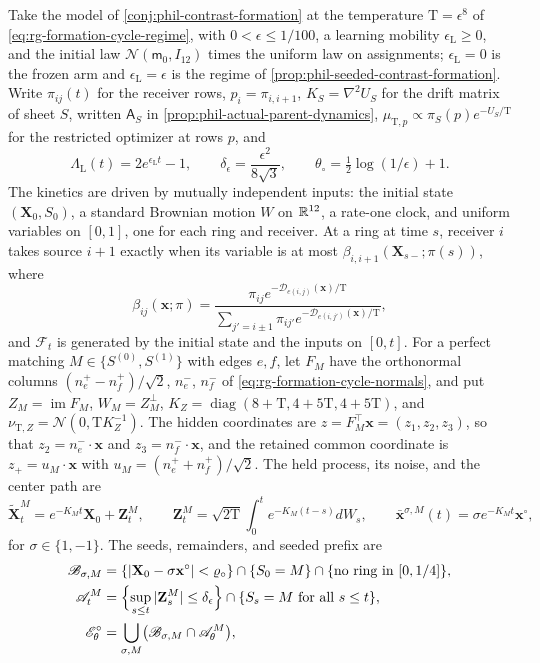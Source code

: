 Take the model of \cref{conj:phil-contrast-formation} at the temperature
\(\mathrm T=\epsilon^8\) of \cref{eq:rg-formation-cycle-regime}, with
\(0<\epsilon\le1/100\), a learning mobility \(\epsilon_{\mathrm L}\ge0\), and
the initial law \(\mathcal N(\mathsf m_0,I_{12})\) times the uniform law on
assignments; \(\epsilon_{\mathrm L}=0\) is the frozen arm and
\(\epsilon_{\mathrm L}=\epsilon\) is the regime of
\cref{prop:phil-seeded-contrast-formation}. Write \(\pi_{ij}(t)\) for the
receiver rows, \(p_i=\pi_{i,i+1}\), \(K_S=\nabla^2U_S\) for the drift matrix
of sheet \(S\), written \(\mathsf A_S\) in
\cref{prop:phil-actual-parent-dynamics},
\(\mu_{\mathrm T,p}\propto\pi_S(p)e^{-U_S/\mathrm T}\) for the
restricted optimizer at rows \(p\), and
\[
 \Lambda_{\mathrm L}(t)=2e^{\epsilon_{\mathrm L}t}-1,\qquad
 \delta_\epsilon=\frac{\epsilon^2}{8\sqrt3},\qquad
 \theta_\circ=\tfrac12\log(1/\epsilon)+1 .
\]
The kinetics are driven by mutually independent inputs: the initial state
\((\mathbf X_0,S_0)\), a standard Brownian motion \(W\) on \(\mathbb R^{12}\), a
rate-one clock, and uniform variables on \([0,1]\), one for each ring and
receiver. At a ring at time \(s\), receiver \(i\) takes source \(i+1\)
exactly when its variable is at most \(\beta_{i,i+1}(\mathbf X_{s-};\pi(s))\),
where
\[
 \beta_{ij}(\mathbf x;\pi)=
 \frac{\pi_{ij}e^{-\mathcal D_{e(i,j)}(\mathbf x)/\mathrm T}}
      {\sum_{j'=i\pm1}\pi_{ij'}e^{-\mathcal D_{e(i,j')}(\mathbf x)/\mathrm T}},
\]
and \(\mathcal F_t\) is generated by the initial state and the inputs on
\([0,t]\). For a perfect matching \(M\in\{S^{(0)},S^{(1)}\}\) with edges
\(e,f\), let \(F_M\) have the orthonormal columns
\((n^+_e-n^+_f)/\sqrt2\), \(n^-_e\), \(n^-_f\) of
\cref{eq:rg-formation-cycle-normals}, and put \(Z_M=\operatorname{im}F_M\),
\(W_M=Z_M^\perp\),
\(K_Z=\operatorname{diag}(8+\mathrm T,4+5\mathrm T,4+5\mathrm T)\), and
\(\nu_{\mathrm T,Z}=\mathcal N(0,\mathrm TK_Z^{-1})\). The hidden coordinates
are \(z=F_M^\top\mathbf x=(z_1,z_2,z_3)\), so that
\(z_2=n^-_e\cdot\mathbf x\) and \(z_3=n^-_f\cdot\mathbf x\), and the retained
common coordinate is \(z_+=u_M\cdot\mathbf x\) with
\(u_M=(n^+_e+n^+_f)/\sqrt2\). The held process, its noise, and the center
path are
\[
 \widetilde{\mathbf X}^M_t=e^{-K_Mt}\mathbf X_0+\mathbf Z^M_t,\qquad
 \mathbf Z^M_t=\sqrt{2\mathrm T}\int_0^te^{-K_M(t-s)}dW_s,\qquad
 \bar{\mathbf x}^{\sigma,M}(t)=\sigma e^{-K_Mt}\mathbf x^\circ,
\]
for \(\sigma\in\{1,-1\}\). The seeds, remainders, and seeded prefix are
\[
\begin{aligned}
 \mathscr B_{\sigma,M}&=\{|\mathbf X_0-\sigma\mathbf x^\circ|<\varrho_\circ\}
   \cap\{S_0=M\}\cap\{\text{no ring in }[0,1/4]\},\\
 \mathscr A^M_t&=\Bigl\{\sup_{s\le t}|\mathbf Z^M_s|\le\delta_\epsilon\Bigr\}
   \cap\{S_s=M\text{ for all }s\le t\},\\
 \mathscr E^\circ_\theta&=\bigcup_{\sigma,M}
   \bigl(\mathscr B_{\sigma,M}\cap\mathscr A^M_\theta\bigr),
\end{aligned}
\]
